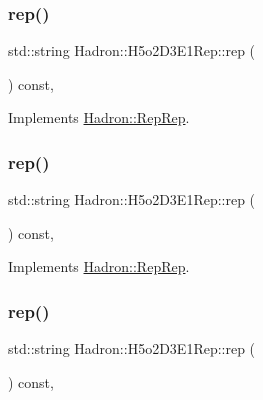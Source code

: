\subsubsection{\texorpdfstring{rep()}{rep()}\hspace{0.1cm}{\footnotesize\ttfamily [1/3]}}
{\footnotesize\ttfamily std\+::string Hadron\+::\+H5o2\+D3\+E1\+Rep\+::rep (\begin{DoxyParamCaption}{ }\end{DoxyParamCaption}) const\hspace{0.3cm}{\ttfamily [inline]}, {\ttfamily [virtual]}}



Implements \mbox{\hyperlink{structHadron_1_1RepRep_ab3213025f6de249f7095892109575fde}{Hadron\+::\+Rep\+Rep}}.

\mbox{\label{structHadron_1_1H5o2D3E1Rep_a08df80842b4ad843fc04e24eb3febd57}} 
\subsubsection{\texorpdfstring{rep()}{rep()}\hspace{0.1cm}{\footnotesize\ttfamily [2/3]}}
{\footnotesize\ttfamily std\+::string Hadron\+::\+H5o2\+D3\+E1\+Rep\+::rep (\begin{DoxyParamCaption}{ }\end{DoxyParamCaption}) const\hspace{0.3cm}{\ttfamily [inline]}, {\ttfamily [virtual]}}



Implements \mbox{\hyperlink{structHadron_1_1RepRep_ab3213025f6de249f7095892109575fde}{Hadron\+::\+Rep\+Rep}}.

\mbox{\label{structHadron_1_1H5o2D3E1Rep_a08df80842b4ad843fc04e24eb3febd57}} 
\subsubsection{\texorpdfstring{rep()}{rep()}\hspace{0.1cm}{\footnotesize\ttfamily [3/3]}}
{\footnotesize\ttfamily std\+::string Hadron\+::\+H5o2\+D3\+E1\+Rep\+::rep (\begin{DoxyParamCaption}{ }\end{DoxyParamCaption}) const\hspace{0.3cm}{\ttfamily [inline]}, {\ttfamily [virtual]}}



